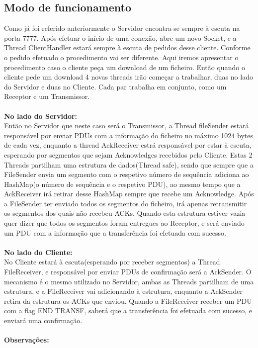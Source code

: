 \documentclass{article}
\begin{document}
\subsection{Modo de funcionamento}
Como já foi referido anteriormente o Servidor encontra-se sempre à escuta na porta 7777. Após efetuar o início de uma conexão,
abre um novo Socket, e a Thread ClientHandler estará sempre à escuta de pedidos desse cliente. Conforme o pedido efetuado o procedimento vai ser
diferente. Aqui iremos apresentar o procedimento caso o cliente peça um download de um ficheiro. Então quando o cliente pede um download
4 novas threads irão começar a trabalhar, duas no lado do Servidor e duas no Cliente. Cada par trabalha em conjunto, como um Receptor e um Transmissor.\\ \\
\textbf{No lado do Servidor:} \\
Então no Servidor que neste caso será o Transmissor, a Thread fileSender estará responsável por enviar PDUs com a informação do ficheiro no
máximo 1024 bytes de cada vez, enquanto a thread AckReceiver estrá responsável por estar à escuta, esperando por segmentos que sejam
Acknowledges recebidos pelo Cliente. Estas 2 Threads partilham uma estrutura de dados(Thread safe), sendo que sempre que a FileSender envia
um segmento com o respetivo número de sequência adiciona ao HashMap(o número de sequência e o respetivo PDU), ao mesmo tempo que a AckReceiver irá
retirar desse HashMap sempre que recebe um Acknowledge. Após a FileSender ter enviado todos os segmentos do ficheiro, irá apenas retransmitir
os segmentos dos quais não recebeu ACKs. Quando esta estrutura estiver vazia quer dizer que todos os segmentos foram entregues ao Receptor, 
e será enviado um PDU com a informação que a transferência foi efetuada com sucesso.\\ \\
\textbf{No lado do Cliente:} \\
No Cliente estará à escuta(esperando por receber segmentos) a Thread FileReceiver, e responsável por enviar PDUs de confirmação será a AckSender.
O mecanismo é o mesmo utilizado no Servidor, ambas as Threads partilham de uma estrutura, e a FileReceiver vai adicionando à estrutura,
enquanto a AckSender retira da estrutura os ACKs que enviou. Quando a FileReceiver receber um PDU com a flag END TRANSF, saberá que a
transferência foi efetuada com sucesso, e enviará uma confirmação.\\ \\
\textbf{Observações:}\\
\end{document}

